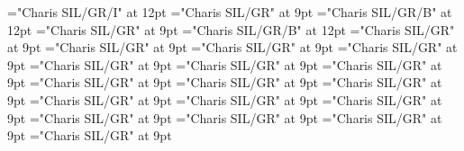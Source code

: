 \documentclass[gps1,twoside]{article}
\begin{document}
\font\spanownertypeabbreviationlexsensereferencelexsensereferencessensesensessensesensesentry="Charis SIL/GR/I" at 12pt
\font\configtargetconfigtargetconfigtargetslexsensereferencelexsensereferencessensesensessensesensesentrybefore="Charis SIL/GR" at 9pt
\font\spanbzhheadwordconfigtargetconfigtargetslexsensereferencelexsensereferencessensesensessensesensesentry="Charis SIL/GR/B" at 12pt
\font\spanspanheadwordconfigtargetconfigtargetslexsensereferencelexsensereferencessensesensessensesensesentrybefore="Charis SIL/GR" at 9pt
\font\spanheadwordconfigtargetconfigtargetslexsensereferencelexsensereferencessensesensessensesensesentry="Charis SIL/GR/B" at 12pt
\font\variantformentrybackrefvariantformentrybackrefvariantformentrybackrefssensesensessensesensesentrybefore="Charis SIL/GR" at 9pt
\font\variantformentrybackrefssensesensessensesensesentrybefore="Charis SIL/GR" at 9pt
\font\variantformentrybackrefssensesensessensesensesentryafter="Charis SIL/GR" at 9pt
\font\variantentrytypevariantentrytypevariantentrytypesvariantformentrybackrefvariantformentrybackrefssensesensessensesensesentrybefore="Charis SIL/GR" at 9pt
\font\variantentrytypesvariantformentrybackrefvariantformentrybackrefssensesensessensesensesentryafter="Charis SIL/GR" at 9pt
\font\spanspanreverseabbrvariantentrytypevariantentrytypesvariantformentrybackrefvariantformentrybackrefssensesensessensesensesentrybefore="Charis SIL/GR" at 9pt
\font\spanreverseabbrvariantentrytypevariantentrytypesvariantformentrybackrefvariantformentrybackrefssensesensessensesensesentrylastchildafter="Charis SIL/GR" at 9pt
\font\spanspanheadwordvariantformentrybackrefvariantformentrybackrefssensesensessensesensesentrybefore="Charis SIL/GR" at 9pt
\font\spanspanowningentrysummarydefinitionvariantformentrybackrefvariantformentrybackrefssensesensessensesensesentrybefore="Charis SIL/GR" at 9pt
\font\spanowningentrysummarydefinitionvariantformentrybackrefvariantformentrybackrefssensesensessensesensesentrylastchildafter="Charis SIL/GR" at 9pt
\font\scientificnamesensesensessensesensesentryafter="Charis SIL/GR" at 9pt
\font\semanticdomainsemanticdomainsemanticdomainssensesensessensesensesentrybefore="Charis SIL/GR" at 9pt
\font\semanticdomainssensesensessensesensesentrybefore="Charis SIL/GR" at 9pt
\font\semanticdomainssensesensessensesensesentryafter="Charis SIL/GR" at 9pt
\font\spanspanabbreviationsemanticdomainsemanticdomainssensesensessensesensesentrybefore="Charis SIL/GR" at 9pt
\font\spanabbreviationsemanticdomainsemanticdomainssensesensessensesensesentrylastchildafter="Charis SIL/GR" at 9pt
\font\spanspannamesemanticdomainsemanticdomainssensesensessensesensesentrybefore="Charis SIL/GR" at 9pt
\end{document}
